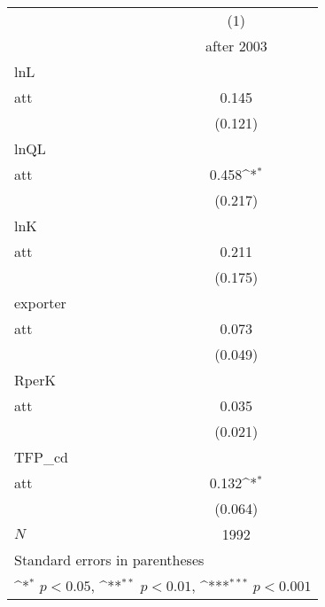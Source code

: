 {
\def\sym#1{\ifmmode^{#1}\else\(^{#1}\)\fi}
\begin{tabular}{l*{1}{c}}
\hline\hline
            &\multicolumn{1}{c}{(1)}\\
            &\multicolumn{1}{c}{after 2003 }\\
\hline
lnL         &                     \\
att         &       0.145         \\
            &     (0.121)         \\
\hline
lnQL        &                     \\
att         &       0.458\sym{*}  \\
            &     (0.217)         \\
\hline
lnK         &                     \\
att         &       0.211         \\
            &     (0.175)         \\
\hline
exporter    &                     \\
att         &       0.073         \\
            &     (0.049)         \\
\hline
RperK       &                     \\
att         &       0.035         \\
            &     (0.021)         \\
\hline
TFP\_cd      &                     \\
att         &       0.132\sym{*}  \\
            &     (0.064)         \\
\hline
\(N\)       &        1992         \\
\hline\hline
\multicolumn{2}{l}{\footnotesize Standard errors in parentheses}\\
\multicolumn{2}{l}{\footnotesize \sym{*} \(p<0.05\), \sym{**} \(p<0.01\), \sym{***} \(p<0.001\)}\\
\end{tabular}
}
